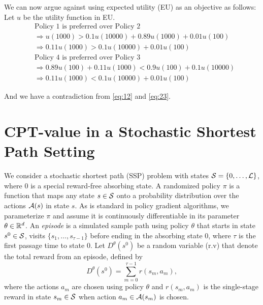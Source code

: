 We can now argue against using expected utility (EU) as an objective as follows: Let $u$ be the utility function in EU.
\begin{align}
&\text{Policy 1 is preferred over Policy 2}\nonumber\\ 
&\Rightarrow u(1000) > 0.1 u(10000) + 0.89 u(1000) + 0.01 u(100)\nonumber\\
&\Rightarrow 0.11 u(1000) > 0.1 u(10000) + 0.01 u(100) \label{eq:12}\\[1ex]
&\text{Policy 4 is preferred over Policy 3}\nonumber\\ 
&\Rightarrow 0.89 u(100) + 0.11 u(1000) < 0.9 u(100) + 0.1 u(10000)\nonumber\\
&\Rightarrow 0.11 u(1000) < 0.1 u(10000) + 0.01 u(100) \label{eq:23}
\end{align}

And we have a contradiction from \eqref{eq:12} and \eqref{eq:23}.

\section{CPT-value in a Stochastic Shortest Path Setting}
\label{sec:cpt-ssp}
We consider a stochastic shortest path (SSP) problem with states $\S=\{0,\ldots,\L\}$, where $0$ is a special reward-free absorbing state.  A randomized policy $\pi$ is a function that maps any state $s\in \S$ onto a probability distribution over the actions $\A(s)$ in state $s$. As is standard in policy gradient algorithms, we parameterize $\pi$ and assume it is continuously differentiable in its parameter $\theta \in \R^d$.  
An \textit{episode} is a simulated sample path using policy $\theta$ that starts in state $s^0\in \S$, visits $\{s_1,\ldots, s_{\tau-1}\}$ before ending in the absorbing state $0$, where $\tau$ is the first passage time to state $0$.
Let $D^\theta(s^0)$ be a random variable (r.v) that denote the total reward from an episode, defined by
$$ D^\theta(s^0) = \sum\limits_{m=0}^{\tau-1} r(s_m,a_m), $$
where the actions $a_m$ are chosen using policy $\theta$ and $r(s_m, a_m)$ is the single-stage reward in state $s_m\in \S$ when action $a_m \in \A(s_m)$ is chosen. 

